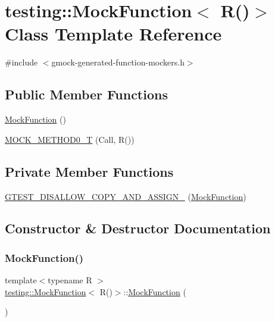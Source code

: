 \hypertarget{classtesting_1_1_mock_function_3_01_r_07_08_4}{}\section{testing\+::Mock\+Function$<$ R()$>$ Class Template Reference}
\label{classtesting_1_1_mock_function_3_01_r_07_08_4}


{\ttfamily \#include $<$gmock-\/generated-\/function-\/mockers.\+h$>$}

\subsection*{Public Member Functions}
\begin{DoxyCompactItemize}
\item 
\mbox{\hyperlink{classtesting_1_1_mock_function_3_01_r_07_08_4_acc6a6896f7f4b116b04e00d5a2088347}{Mock\+Function}} ()
\item 
\mbox{\hyperlink{classtesting_1_1_mock_function_3_01_r_07_08_4_a08e7016e3e060a5cd375b66ff0cc04e8}{M\+O\+C\+K\+\_\+\+M\+E\+T\+H\+O\+D0\+\_\+T}} (Call, R())
\end{DoxyCompactItemize}
\subsection*{Private Member Functions}
\begin{DoxyCompactItemize}
\item 
\mbox{\hyperlink{classtesting_1_1_mock_function_3_01_r_07_08_4_ada8f81bb2aa1d71fc1e2568dc6e03ce0}{G\+T\+E\+S\+T\+\_\+\+D\+I\+S\+A\+L\+L\+O\+W\+\_\+\+C\+O\+P\+Y\+\_\+\+A\+N\+D\+\_\+\+A\+S\+S\+I\+G\+N\+\_\+}} (\mbox{\hyperlink{classtesting_1_1_mock_function}{Mock\+Function}})
\end{DoxyCompactItemize}


\subsection{Constructor \& Destructor Documentation}
\mbox{\label{classtesting_1_1_mock_function_3_01_r_07_08_4_acc6a6896f7f4b116b04e00d5a2088347}} 
\subsubsection{\texorpdfstring{MockFunction()}{MockFunction()}}
{\footnotesize\ttfamily template$<$typename R $>$ \\
\mbox{\hyperlink{classtesting_1_1_mock_function}{testing\+::\+Mock\+Function}}$<$ R()$>$\+::\mbox{\hyperlink{classtesting_1_1_mock_function}{Mock\+Function}} (\begin{DoxyParamCaption}{ }\end{DoxyParamCaption})\hspace{0.3cm}{\ttfamily [inline]}}



